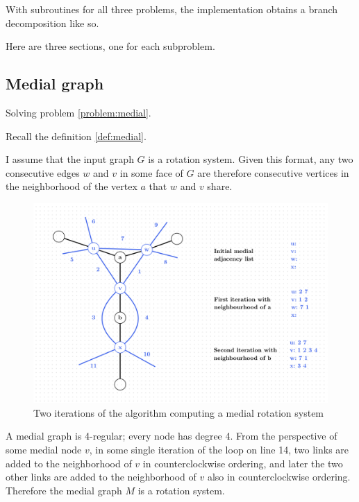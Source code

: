 \documentclass{article}
\begin{document}
	With subroutines for all three problems, the implementation obtains a branch decomposition like so.


	Here are three sections, one for each subproblem.

	\subsection{Medial graph}

		Solving problem \ref{problem:medial}.

		Recall the definition \ref{def:medial}.

		I assume that the input graph $G$ is a rotation system. Given this format, any two consecutive edges $w$ and $v$ in some face of $G$ are therefore consecutive vertices in the neighborhood of the vertex $a$ that $w$ and $v$ share.

		\begin{figure}[H]
			\centering
			\includegraphics[width=\textwidth]{./images/medial-implementation-4-reg-argument.png}
			\caption{Two iterations of the algorithm computing a medial rotation system}
			\label{fig:overview}
		\end{figure}
		
		A medial graph is 4-regular; every node has degree 4. From the perspective of some medial node $v$, in some single iteration of the loop on line 14, two links are added to the neighborhood of $v$ in counterclockwise ordering, and later the two other links are added to the neighborhood of $v$ also in counterclockwise ordering. Therefore the medial graph $M$ is a rotation system.
\end{document}
